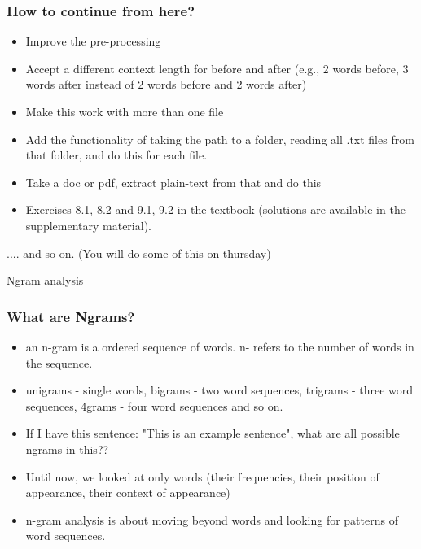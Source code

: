 \documentclass{beamer}
\begin{document}

\begin{frame}
\frametitle{How to continue from here?}
\begin{itemize}
\item Improve the pre-processing 
\item Accept a different context length for before and after (e.g., 2 words before, 3 words after instead of 2 words before and 2 words after)
\item Make this work with more than one file
\item Add the functionality of taking the path to a folder, reading all .txt files from that folder, and do this for each file.
\item Take a doc or pdf, extract plain-text from that and do this
\item Exercises 8.1, 8.2 and 9.1, 9.2 in the textbook (solutions are available in the supplementary material).
\end{itemize}
.... and so on. (You will do some of this on thursday)
\end{frame}

\begin{frame}
\Large Ngram analysis
\end{frame}

\begin{frame}
\frametitle{What are Ngrams?}
\begin{itemize}
\item an n-gram is a ordered sequence of words. n- refers to the number of words in the sequence.
\item unigrams - single words, bigrams - two word sequences, trigrams - three word sequences, 4grams - four word sequences and so on.
\item If I have this sentence: "This is an example sentence", what are all possible ngrams in this?? \pause
\item Until now, we looked at only words (their frequencies, their position of appearance, their context of appearance)
\item n-gram analysis is about moving beyond words and looking for patterns of word sequences.
\end{itemize}
\end{frame}
\end{document}
